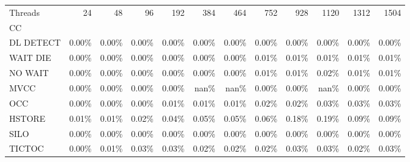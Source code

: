 \begin{tabular}{lrrrrrrrrrrr}
\toprule
Threads &  24   &  48   &  96   &  192  &  384  &  464  &  752  &  928  &  1120 &  1312 &  1504 \\
CC        &       &       &       &       &       &       &       &       &       &       &       \\
\midrule
DL DETECT & 0.00\% & 0.00\% & 0.00\% & 0.00\% & 0.00\% & 0.00\% & 0.00\% & 0.00\% & 0.00\% & 0.00\% & 0.00\% \\
WAIT DIE  & 0.00\% & 0.00\% & 0.00\% & 0.00\% & 0.00\% & 0.00\% & 0.01\% & 0.01\% & 0.01\% & 0.01\% & 0.01\% \\
NO WAIT   & 0.00\% & 0.00\% & 0.00\% & 0.00\% & 0.00\% & 0.00\% & 0.01\% & 0.01\% & 0.02\% & 0.01\% & 0.01\% \\
MVCC      & 0.00\% & 0.00\% & 0.00\% & 0.00\% &  nan\% &  nan\% & 0.00\% & 0.00\% &  nan\% & 0.00\% & 0.00\% \\
OCC       & 0.00\% & 0.00\% & 0.00\% & 0.01\% & 0.01\% & 0.01\% & 0.02\% & 0.02\% & 0.03\% & 0.03\% & 0.03\% \\
HSTORE    & 0.01\% & 0.01\% & 0.02\% & 0.04\% & 0.05\% & 0.05\% & 0.06\% & 0.18\% & 0.19\% & 0.09\% & 0.09\% \\
SILO      & 0.00\% & 0.00\% & 0.00\% & 0.00\% & 0.00\% & 0.00\% & 0.00\% & 0.00\% & 0.00\% & 0.00\% & 0.00\% \\
TICTOC    & 0.00\% & 0.01\% & 0.03\% & 0.03\% & 0.02\% & 0.02\% & 0.02\% & 0.03\% & 0.03\% & 0.02\% & 0.03\% \\
\bottomrule
\end{tabular}

